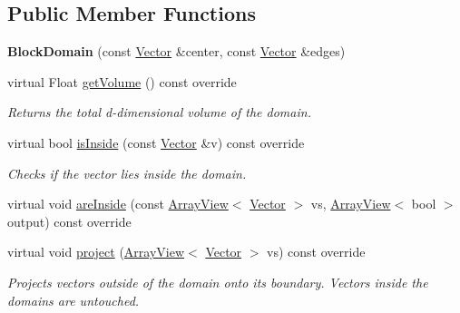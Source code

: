 \subsection*{Public Member Functions}
\begin{DoxyCompactItemize}
\item 
\hypertarget{classBlockDomain_af1564971dfe8aa95843fbc03bcccddb9}{}\label{classBlockDomain_af1564971dfe8aa95843fbc03bcccddb9} 
{\bfseries Block\+Domain} (const \hyperlink{classBasicVector}{Vector} \&center, const \hyperlink{classBasicVector}{Vector} \&edges)
\item 
\hypertarget{classBlockDomain_a02031b9f3dd6da6e2b1fca166b6ae6d4}{}\label{classBlockDomain_a02031b9f3dd6da6e2b1fca166b6ae6d4} 
virtual Float \hyperlink{classBlockDomain_a02031b9f3dd6da6e2b1fca166b6ae6d4}{get\+Volume} () const override
\begin{DoxyCompactList}\small\item\em Returns the total d-\/dimensional volume of the domain. \end{DoxyCompactList}\item 
\hypertarget{classBlockDomain_a4d191bf9138a19801cf1f2c5598563a0}{}\label{classBlockDomain_a4d191bf9138a19801cf1f2c5598563a0} 
virtual bool \hyperlink{classBlockDomain_a4d191bf9138a19801cf1f2c5598563a0}{is\+Inside} (const \hyperlink{classBasicVector}{Vector} \&v) const override
\begin{DoxyCompactList}\small\item\em Checks if the vector lies inside the domain. \end{DoxyCompactList}\item 
virtual void \hyperlink{classBlockDomain_a2dba56e9bbecdc5954147accfdcf331b}{are\+Inside} (const \hyperlink{classArrayView}{Array\+View}$<$ \hyperlink{classBasicVector}{Vector} $>$ vs, \hyperlink{classArrayView}{Array\+View}$<$ bool $>$ output) const override
\item 
\hypertarget{classBlockDomain_a7d9db768e866c04fb76ee3d81629974b}{}\label{classBlockDomain_a7d9db768e866c04fb76ee3d81629974b} 
virtual void \hyperlink{classBlockDomain_a7d9db768e866c04fb76ee3d81629974b}{project} (\hyperlink{classArrayView}{Array\+View}$<$ \hyperlink{classBasicVector}{Vector} $>$ vs) const override
\begin{DoxyCompactList}\small\item\em Projects vectors outside of the domain onto its boundary. Vectors inside the domains are untouched. \end{DoxyCompactList}\end{DoxyCompactItemize}
